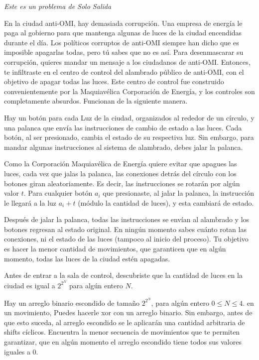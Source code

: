 \documentclass[12pt]{scrartcl}
\begin{document}
    
    {\itshape Este es un problema de Solo Salida}
    
    \vspace{10pt}

    En la ciudad anti-OMI, hay demasiada corrupción. Una empresa de energía le paga al gobierno para que mantenga algunas de luces de la ciudad encendidas durante el día. Los políticos corruptos de anti-OMI siempre han dicho que es imposible apagarlas todas, pero tú sabes que no es así. Para desenmascarar su corrupción, quieres mandar un mensaje a los ciudadanos de anti-OMI. Entonces, te infiltraste en el centro de control del alambrado público de anti-OMI, con el objetivo de apagar todas las luces. Este centro de control fue construido convenientemente por la Maquiavélica Corporación de Energía, y los controles son completamente absurdos. Funcionan de la siguiente manera.
    
    Hay un botón para cada Luz de la ciudad, organizados al rededor de un círculo, y una palanca que envía las instrucciones de cambio de estado a las luces. Cada botón, al ser presionado, cambia el estado de su respectiva luz. Sin embargo, para mandar algunas instrucciones al sistema de alambrado, debes jalar la palanca. 
    
    Como la Corporación Maquiavélica de Energía quiere evitar que apagues las luces, cada vez que jalas la palanca, las conexiones detrás del círculo con los botones giran aleatoriamente. Es decir, las instrucciones se rotarán por algún valor $t$. Para cualquier botón $a_i$ que presionaste, al jalar la palanca, la instrucción le llegará a la luz $a_i + t$ (módulo la cantidad de luces), y esta cambiará de estado.
    
    Después de jalar la palanca, todas las instrucciones se envían al alambrado y los botones regresan al estado original. En ningún momento sabes cuánto rotan las conexiones, ni el estado de las luces (tampoco al inicio del proceso). Tu objetivo es hacer la menor cantidad de movimientos, que garanticen que en algún momento, todas las luces de la ciudad estén apagadas. 

    Antes de entrar a la sala de control, descubriste que la cantidad de luces en la ciudad es igual a $2^{2^N}$ para algún entero $N$.


    Hay un arreglo binario escondido de tamaño $2^{2^N}$, para algún entero $0 \le N \le 4$. en un movimiento, Puedes hacerle xor con un arreglo binario. Sin embargo, antes de que esto suceda, al arreglo escondido se le aplicarán una cantidad arbitraria de shifts cíclicos. Encuentra la menor secuencia de movimientos que te permiten garantizar, que en algún momento el arreglo escondido tiene todos sus valores iguales a 0.
\end{document}

